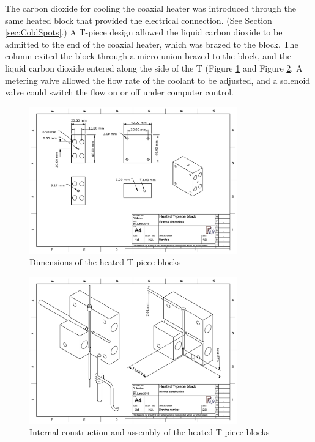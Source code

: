 The carbon dioxide for cooling the coaxial heater was introduced through the
same heated block that provided the electrical connection. (See Section
\ref{sec:ColdSpots}.) A T-piece design allowed the liquid carbon dioxide to be
admitted to the end of the coaxial heater, which was brazed to the block. The
column exited the block through a micro-union brazed to the block, and the
liquid carbon dioxide entered along the side of the T (Figure
\ref{fig:ManifoldDims} and Figure \ref{fig:ManifoldAssy}.  A metering valve
allowed the flow rate of the coolant to be adjusted, and a solenoid valve could
switch the flow on or off under computer control.

\begin{figure}
	\centering
	\includegraphics[angle=90, origin=c, width=0.8\textwidth]{./Figures/ManifoldDimensions.pdf}
	\decoRule
	\caption[Manifold dimensions.]{Dimensions of the heated T-piece blocks}	
	\label{fig:ManifoldDims}
\end{figure}

\begin{figure}
	\centering
	\includegraphics[angle=90, origin=c, width=0.8\textwidth]{./Figures/ManifoldAssemby.pdf}
	\decoRule	
	\caption[Manifold assembly.]{Internal construction and assembly of the heated T-piece blocks}
	\label{fig:ManifoldAssy}
\end{figure}


